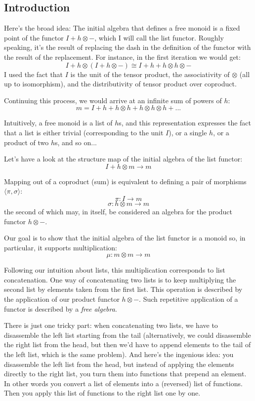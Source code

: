 \documentclass[letterpaper, 10 pt, conference]{ieeeconf}
\begin{document}
\subsection{Introduction}

Here's the broad idea: The initial algebra that defines a free monoid is a fixed point of the functor $I + h \otimes -$, which I will call the list functor. Roughly speaking, it's the result of replacing the dash in the definition of the functor with the result of the replacement. For instance, in the first iteration we would get:
\[I + h \otimes (I + h \otimes -) \cong I + h + h \otimes h \otimes - \]
I used the fact that $I$ is the unit of the tensor product, the associativity of $\otimes$ (all up to isomorphism), and the distributivity of tensor product over coproduct.

Continuing this process, we would arrive at an infinite sum of powers of $h$:
\[m = I + h + h \otimes h + h \otimes h \otimes h + ...\]

Intuitively, a free monoid is a list of $h$s, and this representation expresses the fact that a list is either trivial (corresponding to the unit $I$), or a single $h$, or a product of two $h$s, and so on...

Let's have a look at the structure map of the initial algebra of the list functor:
\[I + h \otimes m \to m\]

Mapping out of a coproduct (sum) is equivalent to defining a pair of morphisms $\langle \pi, \sigma \rangle$:
\[\pi \colon I \to m\]
\[\sigma \colon h \otimes m \to m\]
the second of which may, in itself, be considered an algebra for the product functor $h \otimes -$.

Our goal is to show that the initial algebra of the list functor is a monoid so, in particular, it supports multiplication:
\[\mu \colon m \otimes m \to m\]

Following our intuition about lists, this multiplication corresponds to list concatenation. One way of concatenating two lists is to keep multiplying the second list by elements taken from the first list. This operation is described by the application of our product functor $h \otimes -$. Such repetitive application of a functor is described by a \textit{free algebra}. 

There is just one tricky part: when concatenating two lists, we have to disassemble the left list starting from the tail (alternatively, we could disassemble the right list from the head, but then we'd have to append elements to the tail of the left list, which is the same problem). And here's the ingenious idea: you disassemble the left list from the head, but instead of applying the elements directly to the right list, you turn them into functions that prepend an element. In other words you convert a list of elements into a (reversed) list of functions. Then you apply this list of functions to the right list one by one. 
\end{document}
